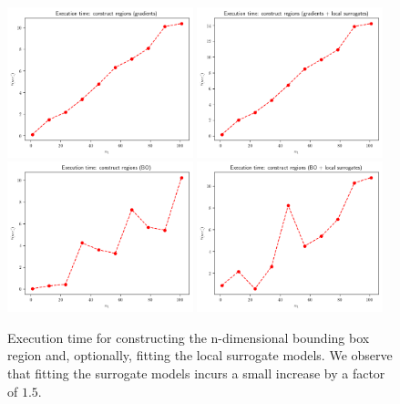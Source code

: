 \begin{figure}[ht]
    \begin{center}
      \includegraphics[width=0.48\textwidth]{./Thesis/images/chapter4/exec_regions_grad.png}
      \includegraphics[width=0.48\textwidth]{./Thesis/images/chapter4/exec_regions_grad_fit.png}\\
      \includegraphics[width=0.48\textwidth]{./Thesis/images/chapter4/exec_regions_bo.png}
      \includegraphics[width=0.48\textwidth]{./Thesis/images/chapter4/exec_regions_bo_fit.png}
    \end{center}
    \caption[Execution time for constructing the n-dimensional bounding box regions.]{Execution time for constructing the n-dimensional
      bounding box region and, optionally, fitting the local surrogate
      models. We observe that fitting the surrogate models incurs a
      small increase by a factor of $1.5$.}
  \label{fig:exec_regions}
\end{figure}



